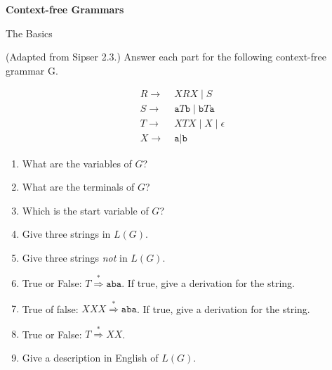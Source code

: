 \documentclass[11pt]{book}
\newcommand{\doctitle}{Context-free Grammars}
\begin{document}
\begin{center}
  \large\textbf{{\doctitle}}
\end{center}

\vspace{2em}


\begin{problem}{The Basics}

(Adapted from Sipser 2.3.)
Answer each part for the following context-free grammar G.

\begin{align*}
  R →&\; XRX \mid S \\
  S →&\; \texttt{a}T\texttt{b} \mid \texttt{b}T\texttt{a} \\
  T →&\; XTX \mid X \mid ϵ \\
  X →&\; \texttt{a} \mid \texttt{b}
\end{align*}

\begin{enumerate}[label=(\alph*)]
  \item What are the variables of \( G \)?
  \item What are the terminals of \( G \)?
  \item Which is the start variable of \( G \)?
  \item Give three strings in \( L(G) \).
  \item Give three strings \emph{not} in \( L(G) \).
  \item True or False: \( T \overset{*}{⇒} \texttt{aba} \).
    If true, give a derivation for the string.
  \item True of false: \( XXX \overset{*}{⇒} \texttt{aba} \).
    If true, give a derivation for the string.
  \item True or False: \( T \overset{*}{⇒} XX \).
  \item Give a description in English of \( L(G) \).
\end{enumerate}

\end{problem}


\newpage
\end{document}
